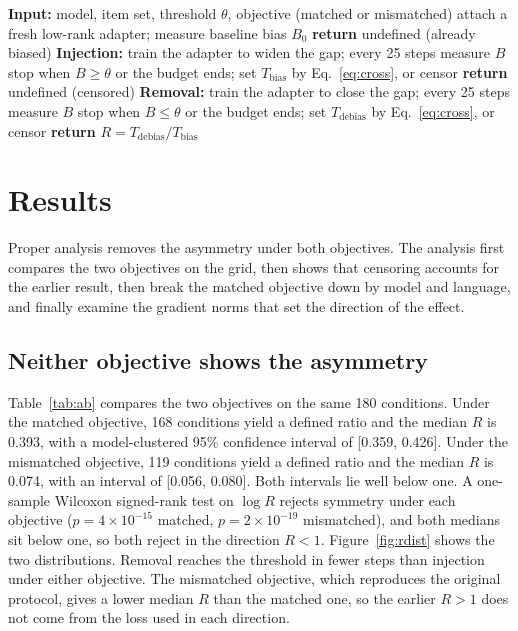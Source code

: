 \documentclass[Afour,sageh,times]{sagej}
\begin{document}
\begin{algorithm}[htbp]
\caption{Inject, remove, and measure $R$ for one condition}
\label{alg:main}
\begin{algorithmic}[1]
\State \textbf{Input:} model, item set, threshold $\theta$, objective (matched or mismatched)
\State attach a fresh low-rank adapter; measure baseline bias $B_0$
 \State \textbf{return} undefined (already biased) \EndIf
\State \textbf{Injection:} train the adapter to widen the gap; every 25 steps measure $B$
\State stop when $B \ge \theta$ or the budget ends; set $T_{\mathrm{bias}}$ by Eq.~\eqref{eq:cross}, or censor
 \State \textbf{return} undefined (censored) \EndIf
\State \textbf{Removal:} train the adapter to close the gap; every 25 steps measure $B$
\State stop when $B \le \theta$ or the budget ends; set $T_{\mathrm{debias}}$ by Eq.~\eqref{eq:cross}, or censor
\State \textbf{return} $R = T_{\mathrm{debias}} / T_{\mathrm{bias}}$
\end{algorithmic}
\end{algorithm}

\section{Results}
\label{sec:results}

Proper analysis removes the asymmetry under both objectives. The analysis first compares the two objectives on the grid, then shows that censoring accounts for the earlier result, then break the matched objective down by model and language, and finally examine the gradient norms that set the direction of the effect.

\subsection{Neither objective shows the asymmetry}

Table~\ref{tab:ab} compares the two objectives on the same 180 conditions. Under the matched objective, 168 conditions yield a defined ratio and the median $R$ is 0.393, with a model-clustered 95\% confidence interval of [0.359, 0.426]. Under the mismatched objective, 119 conditions yield a defined ratio and the median $R$ is 0.074, with an interval of [0.056, 0.080]. Both intervals lie well below one. A one-sample Wilcoxon signed-rank test on $\log R$ rejects symmetry under each objective ($p = 4\times10^{-15}$ matched, $p = 2\times10^{-19}$ mismatched), and both medians sit below one, so both reject in the direction $R < 1$. Figure~\ref{fig:rdist} shows the two distributions. Removal reaches the threshold in fewer steps than injection under either objective. The mismatched objective, which reproduces the original protocol, gives a lower median $R$ than the matched one, so the earlier $R > 1$ does not come from the loss used in each direction.
\end{document}
